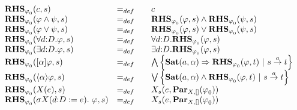 $%
\begin{array}{lll}
{\mathbf{RHS}}_{\varphi _{0}}(c,s) & =_{def} & c \\ 
{\mathbf{RHS}}_{\varphi _{0}}(\varphi \wedge \psi ,s) & =_{def} & {\mathbf{%
RHS}}_{\varphi _{0}}(\varphi ,s)\wedge {\mathbf{RHS}}_{\varphi _{0}}(\psi ,s)
\\ 
{\mathbf{RHS}}_{\varphi _{0}}(\varphi \vee \psi ,s) & =_{def} & {\mathbf{RHS}%
}_{\varphi _{0}}(\varphi ,s)\vee {\mathbf{RHS}}_{\varphi _{0}}(\psi ,s) \\ 
{\mathbf{RHS}}_{\varphi _{0}}(\forall d{{:}D}.\varphi ,s) & =_{def} & 
\forall d{{:}D}.{\mathbf{RHS}}_{\varphi _{0}}(\varphi ,s) \\ 
{\mathbf{RHS}}_{\varphi _{0}}(\exists d{{:}D}.\varphi ,s) & =_{def} & 
\exists d{{:}D}.{\mathbf{RHS}}_{\varphi _{0}}(\varphi ,s) \\ 
{\mathbf{RHS}}_{\varphi _{0}}([\alpha ]\varphi ,s) & =_{def} & \bigwedge
\left\{ \mathbf{Sat}(a,\alpha )\Rightarrow {\mathbf{RHS}}_{\varphi
_{0}}(\varphi ,t)\ |\ s\overset{a}{\rightarrow }t\right\} \\ 
{\mathbf{RHS}}_{\varphi _{0}}(\langle \alpha \rangle \varphi ,s) & =_{def} & 
\bigvee \left\{ \mathbf{Sat}(a,\alpha )\wedge {\mathbf{RHS}}_{\varphi
_{0}}(\varphi ,t)\ |\ s\overset{a}{\rightarrow }t\right\} \\ 
{\mathbf{RHS}}_{\varphi _{0}}(X(e),s) & =_{def} & X_{s}(e,\mathbf{Par}%
_{X,[]}(\varphi _{0})) \\ 
{\mathbf{RHS}}_{\varphi _{0}}(\sigma X(d{:}D:=e).~\varphi ,s) & =_{def}~~~ & 
X_{s}(e,\mathbf{Par}_{X,[]}(\varphi _{0}))%
\end{array}%
$\pagebreak
